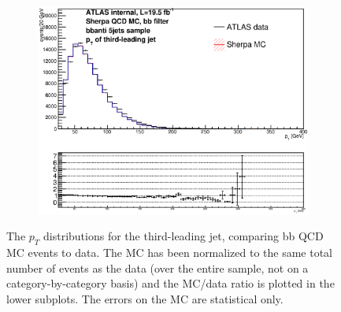 \begin{figure}[phtb!]
\begin{center}
  \begin{subfigure}[$bbanti$ 5+ jet category]{0.3\textwidth}\includegraphics[width=\textwidth]{MonteCarlo/figures/pt2_bbanti_5jets.eps}\end{subfigure}
  \caption{The $p_T$ distributions for the third-leading jet, comparing bb QCD MC events to data.  The MC has been normalized
  to the same total number of events as the data (over the entire sample, not on a category-by-category basis)
  and the MC/data ratio is plotted in the lower subplots.  The errors on the MC are statistical only.
  \label{fig:bb_qcd_mc_pt2}}
    \end{center}
\end{figure}



